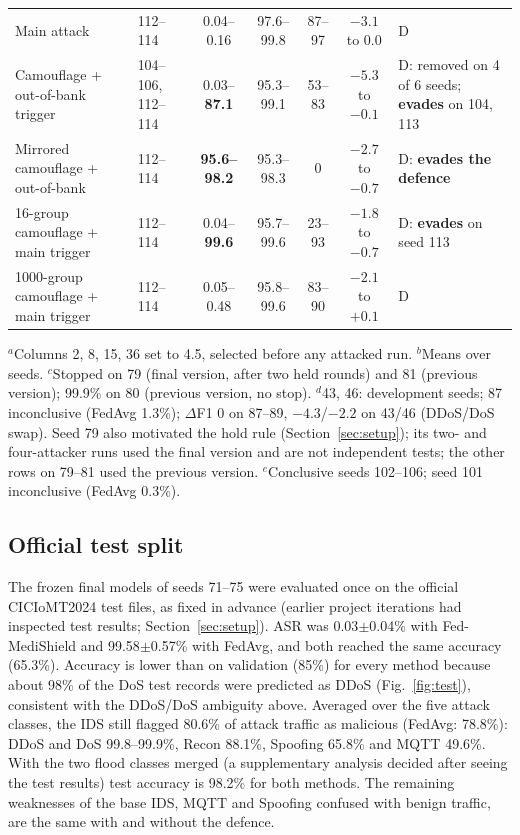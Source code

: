 \documentclass[conference]{IEEEtran}
\begin{document}
\begin{table}[!t]
{\begin{tabular}{@{}lp{1.6cm}ccccp{5.2cm}@{}}
Main attack & 112--114 & 0.04--0.16 & 97.6--99.8 & 87--97 & $-3.1$ to 0.0 & D \\
Camouflage + out-of-bank trigger & 104--106, 112--114 & 0.03--\textbf{87.1} & 95.3--99.1 & 53--83 & $-5.3$ to $-0.1$ & D: removed on 4 of 6 seeds; \textbf{evades} on 104, 113 \\
Mirrored camouflage + out-of-bank & 112--114 & \textbf{95.6--98.2} & 95.3--98.3 & 0 & $-2.7$ to $-0.7$ & D: \textbf{evades the defence} \\
16-group camouflage + main trigger & 112--114 & 0.04--\textbf{99.6} & 95.7--99.6 & 23--93 & $-1.8$ to $-0.7$ & D: \textbf{evades} on seed 113 \\
1000-group camouflage + main trigger & 112--114 & 0.05--0.48 & 95.8--99.6 & 83--90 & $-2.1$ to $+0.1$ & D \\
\bottomrule
\end{tabular}}

\vspace{2pt}
\begin{minipage}{\textwidth}\footnotesize
$^a$Columns 2, 8, 15, 36 set to 4.5, selected before any attacked run. $^b$Means over seeds. $^c$Stopped on 79 (final version, after two held rounds) and 81 (previous version); 99.9\% on 80 (previous version, no stop). $^d$43, 46: development seeds; 87 inconclusive (FedAvg 1.3\%); $\Delta$F1 0 on 87--89, $-4.3$/$-2.2$ on 43/46 (DDoS/DoS swap). Seed 79 also motivated the hold rule (Section~\ref{sec:setup}); its two- and four-attacker runs used the final version and are not independent tests; the other rows on 79--81 used the previous version. $^e$Conclusive seeds 102--106; seed 101 inconclusive (FedAvg 0.3\%).
\end{minipage}
\end{table}


\subsection{Official test split}
The frozen final models of seeds 71--75 were evaluated once on the official CICIoMT2024 test files, as fixed in advance (earlier project iterations had inspected test results; Section~\ref{sec:setup}). ASR was 0.03$\pm$0.04\% with Fed-MediShield and 99.58$\pm$0.57\% with FedAvg, and both reached the same accuracy (65.3\%). Accuracy is lower than on validation (85\%) for every method because about 98\% of the DoS test records were predicted as DDoS (Fig.~\ref{fig:test}), consistent with the DDoS/DoS ambiguity above. Averaged over the five attack classes, the IDS still flagged 80.6\% of attack traffic as malicious (FedAvg: 78.8\%): DDoS and DoS 99.8--99.9\%, Recon 88.1\%, Spoofing 65.8\% and MQTT 49.6\%. With the two flood classes merged (a supplementary analysis decided after seeing the test results) test accuracy is 98.2\% for both methods. The remaining weaknesses of the base IDS, MQTT and Spoofing confused with benign traffic, are the same with and without the defence.
\end{document}
